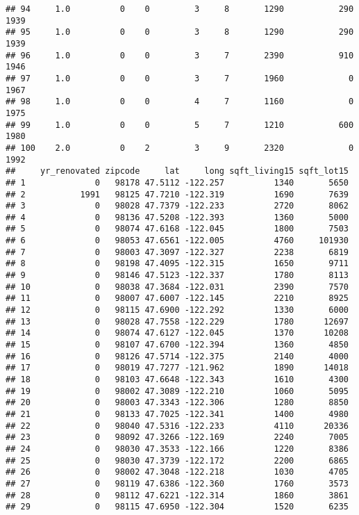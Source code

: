 \documentclass[
]{article}
\begin{document}
\begin{verbatim}
## 94     1.0          0    0         3     8       1290           290     1939
## 95     1.0          0    0         3     8       1290           290     1939
## 96     1.0          0    0         3     7       2390           910     1946
## 97     1.0          0    0         3     7       1960             0     1967
## 98     1.0          0    0         4     7       1160             0     1975
## 99     1.0          0    0         5     7       1210           600     1980
## 100    2.0          0    2         3     9       2320             0     1992
##     yr_renovated zipcode     lat     long sqft_living15 sqft_lot15
## 1              0   98178 47.5112 -122.257          1340       5650
## 2           1991   98125 47.7210 -122.319          1690       7639
## 3              0   98028 47.7379 -122.233          2720       8062
## 4              0   98136 47.5208 -122.393          1360       5000
## 5              0   98074 47.6168 -122.045          1800       7503
## 6              0   98053 47.6561 -122.005          4760     101930
## 7              0   98003 47.3097 -122.327          2238       6819
## 8              0   98198 47.4095 -122.315          1650       9711
## 9              0   98146 47.5123 -122.337          1780       8113
## 10             0   98038 47.3684 -122.031          2390       7570
## 11             0   98007 47.6007 -122.145          2210       8925
## 12             0   98115 47.6900 -122.292          1330       6000
## 13             0   98028 47.7558 -122.229          1780      12697
## 14             0   98074 47.6127 -122.045          1370      10208
## 15             0   98107 47.6700 -122.394          1360       4850
## 16             0   98126 47.5714 -122.375          2140       4000
## 17             0   98019 47.7277 -121.962          1890      14018
## 18             0   98103 47.6648 -122.343          1610       4300
## 19             0   98002 47.3089 -122.210          1060       5095
## 20             0   98003 47.3343 -122.306          1280       8850
## 21             0   98133 47.7025 -122.341          1400       4980
## 22             0   98040 47.5316 -122.233          4110      20336
## 23             0   98092 47.3266 -122.169          2240       7005
## 24             0   98030 47.3533 -122.166          1220       8386
## 25             0   98030 47.3739 -122.172          2200       6865
## 26             0   98002 47.3048 -122.218          1030       4705
## 27             0   98119 47.6386 -122.360          1760       3573
## 28             0   98112 47.6221 -122.314          1860       3861
## 29             0   98115 47.6950 -122.304          1520       6235

\end{verbatim}
\end{document}
